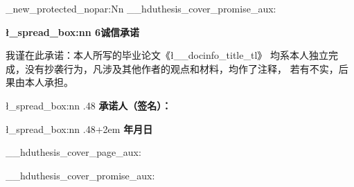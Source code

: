 \cs_new_protected_nopar:Nn \__hduthesis_cover_promise_aux:
  {
    \vspace*{3.5\baselineskip}
    \begin{center}
      \@beginparpenalty\@lowpenalty
      \Large\textsf{\bfseries \l_spread_box:nn {6\ccwd}{诚信承诺}}
      \@endparpenalty\@M
    \end{center}
    \vspace*{.6\baselineskip}\par
    \linespread{2.1}
      {\semilarge
        我谨在此承诺：本人所写的毕业论文《\l__docinfo_title_tl》
        均系本人独立完成，没有抄袭行为，凡涉及其他作者的观点和材料，均作了注释，
        若有不实，后果由本人承担。\par\vspace*{\baselineskip}
        \l_spread_box:nn {.48\linewidth}{}
          \textsf{\bfseries 承诺人（签名）：}
        \vspace*{.5\baselineskip}\par
        \l_spread_box:nn {.48\linewidth+2em}{}
          \textsf{\bfseries 年\qquad 月\qquad 日}
      }
  }

\RenewDocumentCommand \maketitle {}
  {
    \begin{titlepage}
      \__hduthesis_cover_page_aux:
    \end{titlepage}
    \titlepage
      \__hduthesis_cover_promise_aux:
    \endtitlepage
  }
\endinput